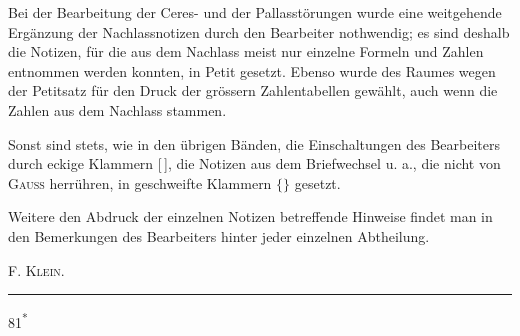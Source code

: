 \par\noindent\hspace*{\parindent}Bei der Bearbeitung der Ceres- und der Pallasstörungen wurde eine weitgehende Ergänzung der
Nachlassnotizen durch den Bearbeiter nothwendig; es sind deshalb die Notizen, für die aus dem Nachlass
meist nur einzelne Formeln und Zahlen entnommen werden konnten, in Petit gesetzt. Ebenso wurde des
Raumes wegen der Petitsatz für den Druck der grössern Zahlentabellen gewählt, auch wenn die Zahlen aus
dem Nachlass stammen.

\par\noindent\hspace*{\parindent}Sonst sind stets, wie in den übrigen Bänden, die Einschaltungen des Bearbeiters durch eckige
Klammern [\,], die Notizen aus dem Briefwechsel u. a., die nicht von \textsc{Gauss} herrühren, in geschweifte
Klammern \(\bigl\{\bigr\}\) gesetzt.

\par\noindent\hspace*{\parindent}Weitere den Abdruck der einzelnen Notizen betreffende Hinweise findet man in den Bemerkungen
des Bearbeiters hinter jeder einzelnen Abtheilung.
\begin{flushright}\textsc{F. Klein}.\end{flushright}
\par\begin{center}\rule{.24\linewidth}{.4pt}\end{center}
\noindent\hfill81\textsuperscript{*}\par
\clearpage
\endgroup
